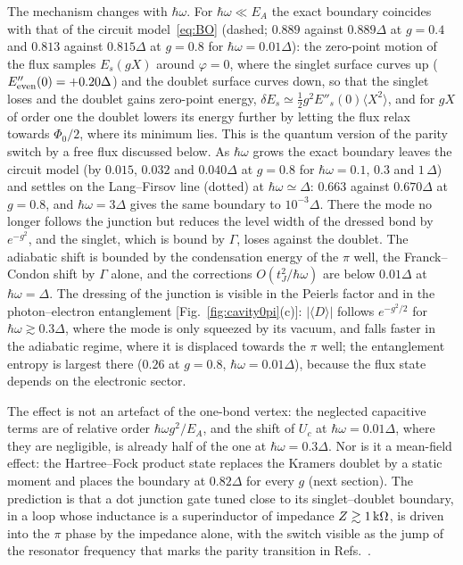 The mechanism changes with $\hbar\omega$. For $\hbar\omega\ll E_A$ the exact boundary coincides with that of
the circuit model~\eqref{eq:BO} (dashed; $0.889$ against $0.889\Delta$ at $g=0.4$ and $0.813$ against
$0.815\Delta$ at $g=0.8$ for $\hbar\omega=0.01\Delta$): the zero-point motion of the flux samples $E_s(gX)$
around $\varphi=0$, where the singlet surface curves up ($E''_{\rm even}(0)=+0.20\Delta$) and the doublet
surface curves down, so that the singlet loses and the doublet gains zero-point energy,
$\delta E_s\simeq\tfrac12g^2E''_s(0)\langle X^2\rangle$, and for $gX$ of order one the doublet lowers its
energy further by letting the flux relax towards $\Phi_0/2$, where its minimum lies. This is the quantum
version of the parity switch by a free flux discussed below. As $\hbar\omega$ grows the exact boundary
leaves the circuit model (by $0.015$, $0.032$ and $0.040\Delta$ at $g=0.8$ for $\hbar\omega=0.1$, $0.3$ and
$1\,\Delta$) and settles on the Lang--Firsov line (dotted) at $\hbar\omega\simeq\Delta$: $0.663$ against
$0.670\Delta$ at $g=0.8$, and $\hbar\omega=3\Delta$ gives the same boundary to $10^{-3}\Delta$. There the mode no
longer follows the junction but reduces the level width of the dressed bond by $e^{-g^2}$, and the singlet,
which is bound by $\Gamma$, loses against the doublet. The adiabatic shift is bounded by the condensation
energy of the $\pi$ well, the Franck--Condon shift by $\Gamma$ alone, and the corrections $O(t_J^2/\hbar\omega)$
are below $0.01\Delta$ at $\hbar\omega=\Delta$. The dressing of the
junction is visible in the Peierls factor and in the photon--electron entanglement
[Fig.~\ref{fig:cavity0pi}(c)]: $|\langle D\rangle|$ follows $e^{-g^2/2}$ for $\hbar\omega\gtrsim0.3\Delta$,
where the mode is only squeezed by its vacuum, and falls faster in the adiabatic regime, where it is
displaced towards the $\pi$ well; the entanglement entropy is largest there ($0.26$ at $g=0.8$,
$\hbar\omega=0.01\Delta$), because the flux state depends on the electronic sector.

The effect is not an artefact of the one-bond vertex: the neglected capacitive terms are of relative order
$\hbar\omega g^2/E_A$, and the shift of $U_c$ at $\hbar\omega=0.01\Delta$, where they are negligible, is
already half of the one at $\hbar\omega=0.3\Delta$. Nor is it a mean-field effect: the Hartree--Fock product
state replaces the Kramers doublet by a static moment and places the boundary at $0.82\Delta$ for every $g$
(next section). The prediction is that a dot junction gate tuned close to its singlet--doublet boundary, in a loop
whose inductance is a superinductor of impedance $Z\gtrsim1\,{\rm k}\Omega$, is driven into the $\pi$ phase
by the impedance alone, with the switch visible as the jump of the resonator frequency that marks the parity
transition in Refs.~\cite{Bargerbos2022,PitaVidal2023}.

